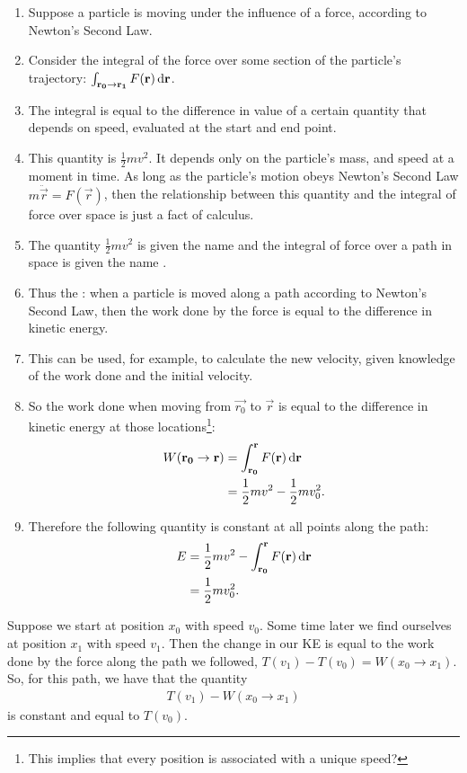 \begin{enumerate}
\item Suppose a particle is moving under the influence of a force, according to Newton's Second Law.
\item Consider the integral of the force over some section of the particle's trajectory:
  $\int_{\vec{r_0 \to \vec{r_1}}} F(\vec{r}) \dif \vec{r}$.
\item The integral is equal to the difference in value of a certain quantity that depends on speed,
  evaluated at the start and end point.
\item This quantity is $\frac{1}{2}mv^2$. It depends only on the particle's mass, and speed at a
  moment in time. As long as the particle's motion obeys Newton's Second Law
  $m\ddot{\vec{r}} = F(\vec{r})$, then the relationship between this quantity and the integral of
  force over space is just a fact of calculus.
\item The quantity $\frac{1}{2}mv^2$ is given the name  and the integral of
  force over a path in space is given the name .
\item Thus the : when a particle is moved along a path according to Newton's
  Second Law, then the work done by the force is equal to the difference in kinetic energy.
\item This can be used, for example, to calculate the new velocity, given knowledge of the work done
  and the initial velocity.
\item So the work done when moving from $\vec{r_0}$ to $\vec{r}$ is equal to the difference in
  kinetic energy at those locations\footnote{This implies that every position is associated with a
    unique speed?}:
  \begin{align*}
    W(\vec{r_0} \to \vec{r})
    &= \int_{\vec{r_0}}^{\vec{r}} F(\vec{r}) \dif \vec{r} \\
    &= \frac{1}{2}mv^2 - \frac{1}{2}mv_0^2.
  \end{align*}
\item Therefore the following quantity is constant at all points along the path:
  \begin{align*}
    E
    &= \frac{1}{2}mv^2 - \int_{\vec{r_0}}^{\vec{r}} F(\vec{r}) \dif \vec{r} \\
    &= \frac{1}{2}mv_0^2.
  \end{align*}
\end{enumerate}




Suppose we start at position $x_0$ with speed $v_0$. Some time later we find ourselves at position
$x_1$ with speed $v_1$. Then the change in our KE is equal to the work done by the force along the
path we followed, $T(v_1) - T(v_0) = W(x_0 \to x_1)$. So, for this path, we have that the quantity
\begin{align*}
  T(v_1) - W(x_0 \to x_1)
\end{align*}
is constant and equal to $T(v_0)$.


